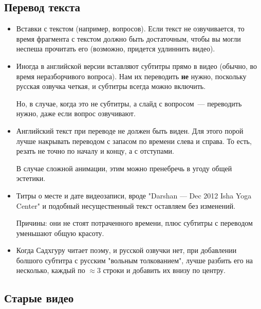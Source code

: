 \documentclass[
a4paper, %
12pt, %
article,
onecolumn, %
openany, %
]{memoir}
\begin{document}
\subsection{Перевод текста}

\begin{itemize}

\item Вставки с текстом (например, вопросов). Если текст не озвучивается, то время фрагмента с текстом должно быть достаточным, чтобы вы могли неспеша прочитать его (возможно, придется удлиннить видео).

\item Иногда в английской версии вставляют субтитры прямо в видео
    {\color{gray}(обычно, во время неразборчивого вопроса)}. Нам их переводить
    \textbf{не} нужно, поскольку русская озвучка четкая, 
    и субтитры всегда можно включить.

    Но, в случае, когда это не субтитры, а слайд с вопросом~--- 
    переводить нужно, даже если вопрос озвучивают.
\item Английский текст при переводе не должен быть виден. Для этого порой лучше
    накрывать переводом с запасом по времени слева и справа. То есть, резать
    не точно по началу и концу, а с отступами.

    В случае сложной анимации, этим можно пренебречь в угоду общей эстетики.


\item Титры о месте и дате видеозаписи, вроде "Darshan — Dec 2012
    Isha Yoga Center" и подобный несущественный текст оставляем без изменений.

    {\color{gray} Причины: они не стоят потраченного времени, плюс 
     субтитры с переводом уменьшают  общую красоту.}

 \item Когда Садхгуру читает поэму, и русской озвучки нет, при добавлении 
     болшого субтитра с русским "вольным толкованием", лучше разбить его на 
     несколько, каждый
     по $\approx 3$ строки и добавить их внизу по центру. 

\end{itemize}


\subsection{Старые видео}
\end{document}
